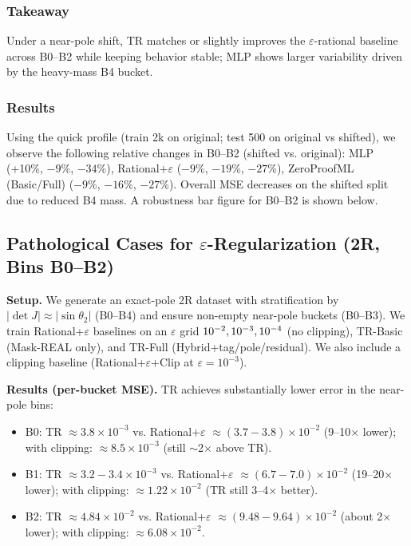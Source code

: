 \documentclass[11pt,twoside]{article}
\begin{document}
\subsubsection{Takeaway}

Under a near-pole shift, TR matches or slightly improves the $\varepsilon$-rational baseline across B0--B2 while keeping behavior stable; MLP shows larger variability driven by the heavy-mass B4 bucket.

\subsubsection{Results}

Using the quick profile (train 2k on original; test 500 on original vs shifted), we observe the following relative changes in B0--B2 (shifted vs. original): MLP (+10\%, $-9$\%, $-34$\%), Rational+$\varepsilon$ ($-9$\%, $-19$\%, $-27$\%), ZeroProofML (Basic/Full) ($-9$\%, $-16$\%, $-27$\%). Overall MSE decreases on the shifted split due to reduced B4 mass. A robustness bar figure for B0--B2 is shown below.

\subsection{Pathological Cases for $\varepsilon$-Regularization (2R, Bins B0--B2)}
\textbf{Setup.} We generate an exact-pole 2R dataset with stratification by $|\det J|\approx|\sin\theta_2|$ (B0--B4) and ensure non-empty near-pole buckets (B0--B3). We train Rational+$\varepsilon$ baselines on an $\varepsilon$ grid $\\{10^{-2},10^{-3},10^{-4}\\}$ (no clipping), TR-Basic (Mask-REAL only), and TR-Full (Hybrid+tag/pole/residual). We also include a clipping baseline (Rational+$\varepsilon$+Clip at $\varepsilon=10^{-3}$).

\textbf{Results (per-bucket MSE).} TR achieves substantially lower error in the near-pole bins:
\begin{itemize}
  \item B0: TR $\approx 3.8\times10^{-3}$ vs. Rational+$\varepsilon$ $\approx (3.7{-}3.8)\times10^{-2}$ (9--10$\times$ lower); with clipping: $\approx 8.5\times10^{-3}$ (still $\sim$2$\times$ above TR).
  \item B1: TR $\approx 3.2{-}3.4\times10^{-3}$ vs. Rational+$\varepsilon$ $\approx (6.7{-}7.0)\times10^{-2}$ (19--20$\times$ lower); with clipping: $\approx 1.22\times10^{-2}$ (TR still 3--4$\times$ better).
  \item B2: TR $\approx 4.84\times10^{-2}$ vs. Rational+$\varepsilon$ $\approx (9.48{-}9.64)\times10^{-2}$ (about 2$\times$ lower); with clipping: $\approx 6.08\times10^{-2}$.
\end{itemize}
\end{document}
